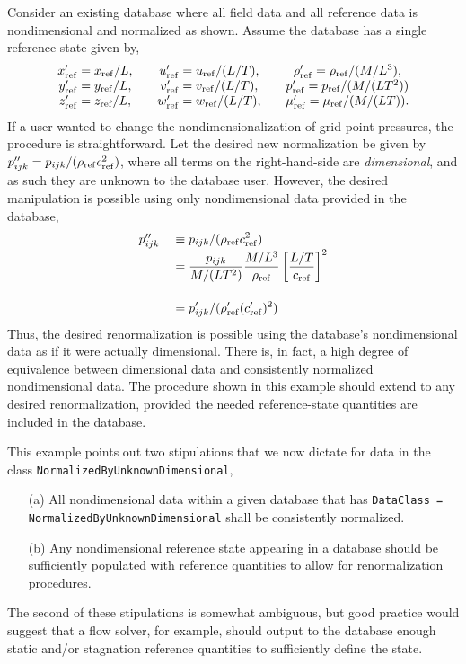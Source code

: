 Consider an existing database where all field data and all reference
data is nondimensional and normalized as shown.  Assume the database has
a single reference state given by,
$$
\begin{array}{c@{\qquad}c@{\qquad}c}
 x'_\refer = x_\refer/L, & u'_\refer = u_\refer/(L/T), & \rho'_\refer = \rho_\refer/(M/L^3), \\ 
 y'_\refer = y_\refer/L, & v'_\refer = v_\refer/(L/T), & p'_\refer = p_\refer/(M/(L T^2)) \\
 z'_\refer = z_\refer/L, & w'_\refer = w_\refer/(L/T), & \mu'_\refer = \mu_\refer/(M/(L T)).
\end{array}
$$
If a user wanted to change the nondimensionalization of grid-point
pressures, the procedure is straightforward.
Let the desired new normalization be given by
$p''_{ijk} = p_{ijk} / (\rho_{\rm ref} c_{\rm ref}^2)$, where all terms on
the right-hand-side are \emph{dimensional}, and as such they are unknown
to the database user.
However, the desired manipulation is possible using only nondimensional
data provided in the database,
$$
\begin{array}{cl}
 p''_{ijk} & \ds {}\equiv p_{ijk} / (\rho_\refer c_\refer^2) \\[.02in]
           & \ds {}= {p_{ijk} \over M/(L T^2)} {M/L^3 \over \rho_\refer}
	             \left[ L/T \over c_\refer \right]^2 \\
 \noalign{\smallskip} \\
           & \ds {}= p'_{ijk} / (\rho'_\refer (c'_\refer)^2)
\end{array}
$$
Thus, the desired renormalization is possible using the database's
nondimensional data as if it were actually dimensional.  There is,
in fact, a high degree of equivalence between dimensional data and
consistently normalized nondimensional data.  The procedure shown in
this example should extend to any desired renormalization, provided the
needed reference-state quantities are included in the database.

This example points out two stipulations that we now dictate for 
data in the class \texttt{NormalizedByUnknownDimensional},
\begin{enumerate}
\item[(a)]
All nondimensional data within a given database that has 
\texttt{DataClass = NormalizedByUnknownDimensional}
shall be consistently normalized.
\item[(b)]
Any nondimensional reference state appearing in a database should
be sufficiently populated with reference quantities to allow for
renormalization procedures.
\end{enumerate}
The second of these stipulations is somewhat ambiguous, but good
practice would suggest that a flow solver, for example, should output
to the database enough static and/or stagnation reference quantities to
sufficiently define the state.

